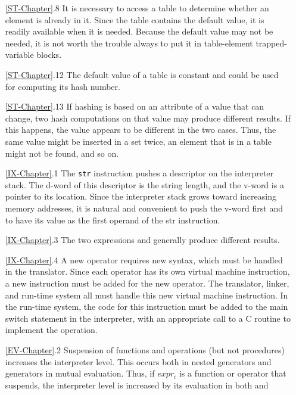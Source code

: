 \begin{itemize}
\goodbreak\item[\ref*{ST-Chapter}.8]
It is necessary to access a table to determine whether an element is
already in it. Since the table contains the default value, it is readily available
when it is needed. Because the default value may not be needed, it is
not worth the trouble always to put it in table-element trapped-variable
blocks.

\goodbreak\item[\ref*{ST-Chapter}.12]
The default value of a table is constant and could be used for computing
its hash number.

\goodbreak\item[\ref*{ST-Chapter}.13]
If hashing is based on an attribute of a value that can change, two hash
computations on that value may produce different results. If this happens,
the value appears to be different in the two cases. Thus, the same value
might be inserted in a set twice, an element that is in a table might not be
found, and so on.

\goodbreak\item[\ref*{IX-Chapter}.1]
The \texttt{str} instruction pushes a descriptor on the interpreter stack. 
The d-word of this descriptor is the string length, and the v-word is a pointer
to its location. Since the interpreter stack grows toward increasing memory
addresses, it is natural and convenient to push the v-word first and to have its
value as the first operand of the str instruction.

\goodbreak\item[\ref*{IX-Chapter}.3]
The two expressions
and
generally produce different results.

\goodbreak\item[\ref*{IX-Chapter}.4]
A new operator requires new syntax, which must be handled in the translator.
Since each operator has its own virtual machine instruction, a new
instruction must be added for the new operator. The translator, linker, and
run-time system all must handle this new virtual machine instruction. In
the run-time system, the code for this instruction must be added to the
main switch statement in the interpreter, with an appropriate call to a C
routine to implement the operation.

\goodbreak\item[\ref*{EV-Chapter}.2]
Suspension of functions and operations (but not procedures) increases the
interpreter level. This occurs both in nested generators and generators in
mutual evaluation. Thus, if $expr_i$ is a function or operator that suspends,
the interpreter level is increased by its evaluation in both
and


\end{itemize}
